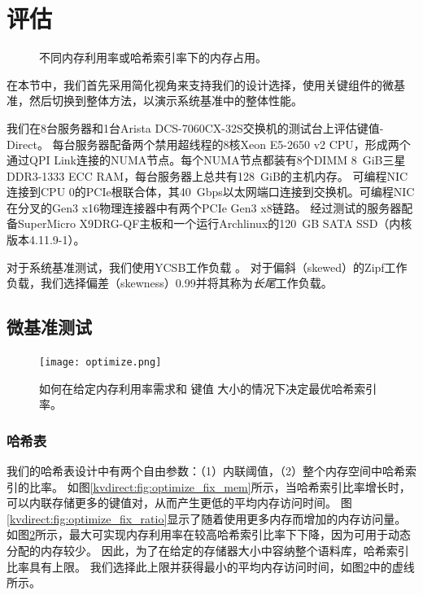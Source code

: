 \section{评估}
\label{kvdirect:sec:eval}

\begin{figure}[t]
\caption{不同内存利用率或哈希索引率下的内存占用。}
\label{kvdirect:fig:memory-access-count}
\end{figure}

\label{kvdirect:sec:evaluation}
在本节中，我们首先采用简化视角来支持我们的设计选择，使用关键组件的微基准，然后切换到整体方法，以演示系统基准中\oursys {}的整体性能。


我们在8台服务器和1台Arista DCS-7060CX-32S交换机的测试台上评估键值-Direct。
每台服务器配备两个禁用超线程的8核Xeon E5-2650 v2 CPU，形成两个通过QPI Link连接的NUMA节点。每个NUMA节点都装有8个DIMM 8~GiB三星DDR3-1333 ECC RAM，每台服务器上总共有128~GiB的主机内存。
可编程NIC~ \cite {caulfield2016cloud}连接到CPU 0的PCIe根联合体，其40~Gbps以太网端口连接到交换机。可编程NIC在分叉的Gen3 x16物理连接器中有两个PCIe Gen3 x8链路。
经过测试的服务器配备SuperMicro X9DRG-QF主板和一个运行Archlinux的120~GB SATA SSD（内核版本4.11.9-1）。

对于系统基准测试，我们使用YCSB工作负载 \cite {cooper2010benchmarking}。
对于偏斜（skewed）的Zipf工作负载，我们选择偏差（skewness）0.99并将其称为\textit {长尾}工作负载。

\subsection{微基准测试}
\label{kvdirect:sec:microbenchmarks}


\begin{figure}[t]
\centering
\texttt{[image: optimize.png]}
\caption{如何在给定内存利用率需求和 键值 大小的情况下决定最优哈希索引率。}
\label{kvdirect:fig:hashline-ratio}

\end{figure}

\subsubsection{哈希表}
\label{kvdirect:sec:hashtable-eval}

我们的哈希表设计中有两个自由参数：（1）内联阈值，（2）整个内存空间中哈希索引的比率。
如图\ref {kvdirect:fig:optimize_fix_mem}所示，当哈希索引比率增长时，可以内联存储更多的键值对，从而产生更低的平均内存访问时间。
图\ref {kvdirect:fig:optimize_fix_ratio}显示了随着使用更多内存而增加的内存访问量。
如图\ref {kvdirect:fig:hashline-ratio}所示，最大可实现内存利用率在较高哈希索引比率下下降，因为可用于动态分配的内存较少。
因此，为了在给定的存储器大小中容纳整个语料库，哈希索引比率具有上限。
我们选择此上限并获得最小的平均内存访问时间，如图\ref {kvdirect:fig:hashline-ratio}中的虚线所示。

